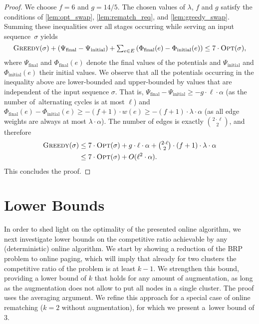 \documentclass{siamart190516}
\newcommand{\GREEDY}{\textsc{Greedy}\xspace}
\newcommand{\OPT}{\textsc{Opt}\xspace}
\begin{document}
\begin{proof}
We choose $f = 6$ and $g = 14/5$. The chosen values of $\lambda$, $f$ and $g$
satisfy the conditions of \cref{lem:opt_swap}, \cref{lem:rematch_req},
and \cref{lem:greedy_swap}. Summing these
inequalities over all stages occurring while serving an input sequence~$\sigma$
yields
\begin{equation*}
	\textstyle \GREEDY(\sigma) + (\Psi_\textrm{final} - \Psi_\textrm{initial})
	+ \sum_{e \in E} \left( 
		\Phi_\textrm{final}(e) - \Phi_\textrm{initial}(e) \right)
	\leq 7 \cdot \OPT(\sigma),
\end{equation*}
where $\Psi_\textrm{final}$ and $\Phi_\textrm{final}(e)$ denote the final
values of the potentials and $\Psi_\textrm{initial}$ and
$\Phi_\textrm{initial}(e)$ their initial values. We observe that all the
potentials occurring in the inequality above are lower-bounded and
upper-bounded by values that are independent of the input sequence $\sigma$.
That is, $\Psi_\textrm{final} - \Psi_\textrm{initial} \geq - g \cdot \ell
\cdot \alpha$ (as the number of~alternating cycles is at most $\ell$) and
$\Phi_\textrm{final}(e) - \Phi_\textrm{initial}(e) \geq - (f+1) \cdot w(e)
\geq - (f+1) \cdot \lambda \cdot \alpha$ (as all edge weights are always 
at most $\lambda \cdot \alpha$). The number of edges is exactly $\binom{2
\cdot \ell}{2}$, and therefore
\begin{align*}
	 \GREEDY(\sigma) 
	\leq &\; 7 \cdot \OPT(\sigma) 
	+ \textstyle g \cdot \ell \cdot \alpha + \binom{2 \cdot \ell}{2} \cdot (f+1) \cdot 
	\lambda \cdot \alpha \\
	\leq &\; 7 \cdot \OPT(\sigma) 
	+ O(\ell^2 \cdot \alpha).
\end{align*}
This concludes the proof.
\end{proof}




\section{Lower Bounds}
\label{sec:lower}

In order to shed light on the optimality of the presented online algorithm, we
next investigate lower bounds on the competitive ratio achievable by any
(deterministic) online algorithm. We start by showing a reduction of the BRP
problem to online paging, which will imply that already for two clusters the
competitive ratio of the problem is at least $k-1$. We strengthen this bound,
providing a lower bound of $k$ that holds for any amount of augmentation, as
long as the augmentation does not allow to put all nodes in a single 
cluster. The proof uses the averaging argument. We refine this approach for a
special case of online rematching ($k = 2$ without augmentation), for which we
present a~lower bound of $3$.
\end{document}
